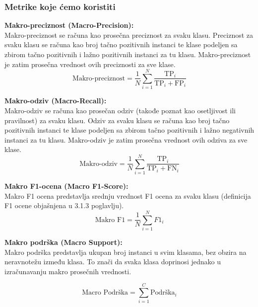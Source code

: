 \documentclass{article}
\begin{document}
\newpage




\subsubsection{Metrike koje ćemo koristiti}



\begin{flushleft}
    
\textbf{Makro-preciznost (Macro-Precision):}\\
Makro-preciznost se računa kao prosečna preciznost za svaku klasu. Preciznost za svaku klasu se računa kao broj tačno pozitivnih instanci te klase podeljen sa zbirom tačno pozitivnih i lažno pozitivnih instanci za tu klasu. Makro-preciznost je zatim prosečna vrednost ovih preciznosti za sve klase.\\
\[
\text{Makro-preciznost} = \frac{1}{N} \sum_{i=1}^{N} \frac{\text{TP}_i}{\text{TP}_i + \text{FP}_i}
\]
\vspace{2.75mm}

\textbf{Makro-odziv (Macro-Recall):}\\
Makro-odziv se računa kao prosečan odziv (takođe poznat kao osetljivost ili pravilnost) za svaku klasu. Odziv za svaku klasu se računa kao broj tačno pozitivnih instanci te klase podeljen sa zbirom tačno pozitivnih i lažno negativnih instanci za tu klasu. Makro-odziv je zatim prosečna vrednost ovih odziva za sve klase. \\
\[
\text{Makro-odziv} = \frac{1}{N} \sum_{i=1}^{N} \frac{\text{TP}_i}{\text{TP}_i + \text{FN}_i}
\]
\vspace{2.75mm}

\textbf{Makro F1-ocena (Macro F1-Score):}\\
Makro F1 ocena predstavlja srednju vrednost F1 ocena za svaku klasu (definicija F1 ocene objašnjena u 3.1.3 poglavlju).\\
\[
\text{Makro F1} = \frac{1}{N} \sum_{i=1}^{N} F1_i
\]

\vspace{2.75mm}
\textbf{Makro podrška (Macro Support):}\\
Makro podrška predstavlja ukupan broj instanci u svim klasama, bez obzira na neravnotežu između klasa. To znači da svaka klasa doprinosi jednako u izračunavanju makro prosečnih vrednosti. 

\[
\text{Macro Podrška} = \sum_{i=1}^{C} \text{Podrška}_i
\]
\vspace{2.75mm}



\end{flushleft}
\end{document}
